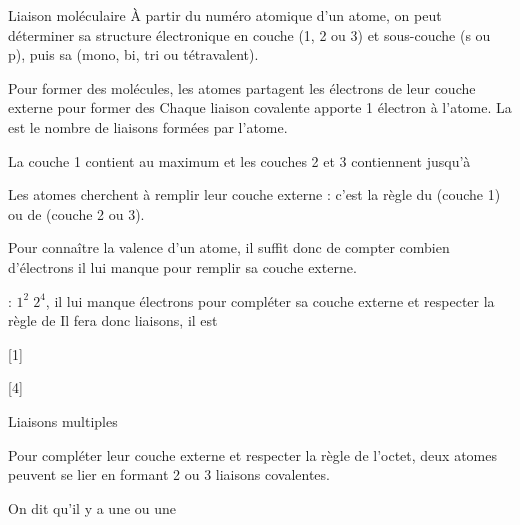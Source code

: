 \begin{doc}{Liaison moléculaire}
  À partir du numéro atomique d'un atome, on peut déterminer sa structure électronique en couche (1, 2 ou 3) et sous-couche (s ou p), puis sa  (mono, bi, tri ou tétravalent).
  \begin{importants}
    Pour former des molécules, les atomes partagent les électrons de leur couche externe pour former des 
    Chaque liaison covalente apporte 1 électron à l'atome.
    La  est le nombre de liaisons formées par l'atome.
  \end{importants}
  \begin{importants}
    La couche 1 contient au maximum  et les couches 2 et 3 contiennent jusqu'à 

    Les atomes cherchent à remplir leur couche externe : c'est la règle du  (couche 1) ou de  (couche 2 ou 3).
  \end{importants}
  Pour connaître la valence d'un atome, il suffit donc de compter combien d'électrons il lui manque pour remplir sa couche externe.

  \exemple {} : $1^2\; 2^4$,
  il lui manque  électrons pour compléter sa couche externe et respecter la règle de 
  Il fera donc  liaisons, il est 
\end{doc}


[1]

%
\pasCorrection{\newpage\vspace*{-30pt}}
[4]


\begin{doc}{Liaisons multiples}
  \begin{importants}
    Pour compléter leur couche externe et respecter la règle de l'octet, deux atomes peuvent se lier en formant 2 ou 3 liaisons covalentes.
    
    On dit qu'il y a une  ou une 
  \end{importants}
\end{doc}

